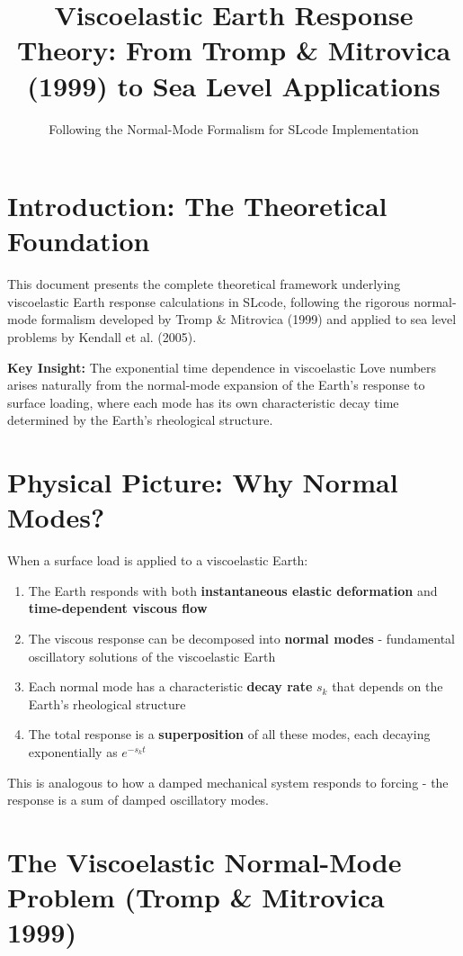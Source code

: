 \documentclass{article}
\title{Viscoelastic Earth Response Theory: From Tromp \& Mitrovica (1999) to Sea Level Applications}
\author{Following the Normal-Mode Formalism for SLcode Implementation}
\date{}
\begin{document}
\maketitle

\section{Introduction: The Theoretical Foundation}

This document presents the complete theoretical framework underlying viscoelastic Earth response calculations in SLcode, following the rigorous normal-mode formalism developed by Tromp \& Mitrovica (1999) and applied to sea level problems by Kendall et al. (2005).

\textbf{Key Insight:} The exponential time dependence in viscoelastic Love numbers arises naturally from the normal-mode expansion of the Earth's response to surface loading, where each mode has its own characteristic decay time determined by the Earth's rheological structure.

\section{Physical Picture: Why Normal Modes?}

When a surface load is applied to a viscoelastic Earth:
\begin{enumerate}
\item The Earth responds with both \textbf{instantaneous elastic deformation} and \textbf{time-dependent viscous flow}
\item The viscous response can be decomposed into \textbf{normal modes} - fundamental oscillatory solutions of the viscoelastic Earth
\item Each normal mode has a characteristic \textbf{decay rate} $s_k$ that depends on the Earth's rheological structure
\item The total response is a \textbf{superposition} of all these modes, each decaying exponentially as $e^{-s_k t}$
\end{enumerate}

This is analogous to how a damped mechanical system responds to forcing - the response is a sum of damped oscillatory modes.

\section{The Viscoelastic Normal-Mode Problem (Tromp \& Mitrovica 1999)}
\end{document}
